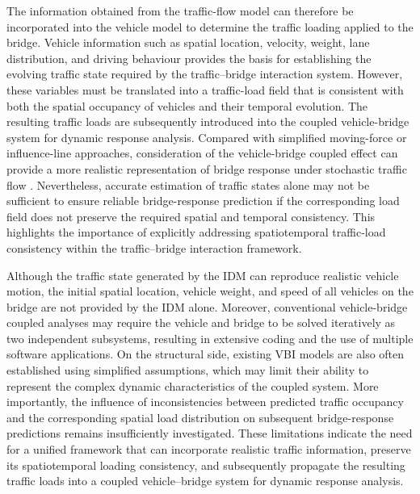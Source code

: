 \documentclass[journal]{IEEEtran}
\begin{document}
The information obtained from the traffic-flow model can therefore be incorporated into the vehicle model to determine the traffic loading applied to the bridge. Vehicle information such as spatial location, velocity, weight, lane distribution, and driving behaviour provides the basis for establishing the evolving traffic state required by the traffic--bridge interaction system. However, these variables must be translated into a traffic-load field that is consistent with both the spatial occupancy of vehicles and their temporal evolution. The resulting traffic loads are subsequently introduced into the coupled vehicle-bridge system for dynamic response analysis. Compared with simplified moving-force or influence-line approaches, consideration of the vehicle-bridge coupled effect can provide a more realistic representation of bridge response under stochastic traffic flow \cite{yang2005,cantero2010}. Nevertheless, accurate estimation of traffic states alone may not be sufficient to ensure reliable bridge-response prediction if the corresponding load field does not preserve the required spatial and temporal consistency. This highlights the importance of explicitly addressing spatiotemporal traffic-load consistency within the traffic--bridge interaction framework.

Although the traffic state generated by the IDM can reproduce realistic vehicle motion, the initial spatial location, vehicle weight, and speed of all vehicles on the bridge are not provided by the IDM alone. Moreover, conventional vehicle-bridge coupled analyses may require the vehicle and bridge to be solved iteratively as two independent subsystems, resulting in extensive coding and the use of multiple software applications. On the structural side, existing VBI models are also often established using simplified assumptions, which may limit their ability to represent the complex dynamic characteristics of the coupled system. More importantly, the influence of inconsistencies between predicted traffic occupancy and the corresponding spatial load distribution on subsequent bridge-response predictions remains insufficiently investigated. These limitations indicate the need for a unified framework that can incorporate realistic traffic information, preserve its spatiotemporal loading consistency, and subsequently propagate the resulting traffic loads into a coupled vehicle--bridge system for dynamic response analysis.
\end{document}
